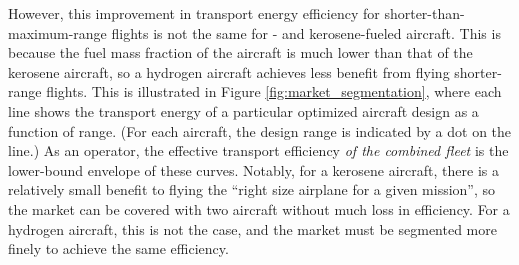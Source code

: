 However, this improvement in transport energy efficiency for shorter-than-maximum-range flights is not the same for \lh- and kerosene-fueled aircraft. This is because the fuel mass fraction of the \lh aircraft is much lower than that of the kerosene aircraft, so a hydrogen aircraft achieves less benefit from flying shorter-range flights. This is illustrated in Figure \ref{fig:market_segmentation}, where each line shows the transport energy of a particular optimized aircraft design as a function of range. (For each aircraft, the design range is indicated by a dot on the line.) As an operator, the effective transport efficiency \emph{of the combined fleet} is the lower-bound envelope of these curves. Notably, for a kerosene aircraft, there is a relatively small benefit to flying the ``right size airplane for a given mission'', so the market can be covered with two aircraft without much loss in efficiency. For a hydrogen aircraft, this is not the case, and the market must be segmented more finely to achieve the same efficiency.

